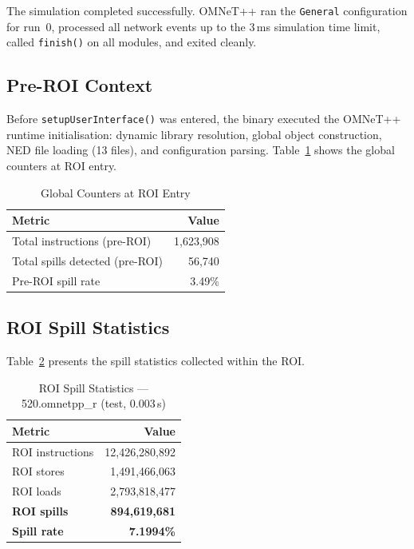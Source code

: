 \documentclass[conference]{IEEEtran}
\begin{document}
The simulation completed successfully. OMNeT++ ran the
\texttt{General} configuration for run~0, processed all network
events up to the 3\,ms simulation time limit, called
\texttt{finish()} on all modules, and exited cleanly.

\subsection{Pre-ROI Context}

Before \texttt{setupUserInterface()} was entered, the binary
executed the OMNeT++ runtime initialisation: dynamic library
resolution, global object construction, NED file loading (13 files),
and configuration parsing. Table~\ref{tab:preroi} shows the global
counters at ROI entry.

\begin{table}[H]
\centering
\caption{Global Counters at ROI Entry}
\label{tab:preroi}
\begin{tabular}{lr}
\toprule
\textbf{Metric} & \textbf{Value} \\
\midrule
Total instructions (pre-ROI) & 1,623,908 \\
Total spills detected (pre-ROI) & 56,740 \\
Pre-ROI spill rate & 3.49\% \\
\bottomrule
\end{tabular}
\end{table}

\subsection{ROI Spill Statistics}

Table~\ref{tab:roi} presents the spill statistics collected within
the ROI.

\begin{table}[H]
\centering
\caption{ROI Spill Statistics --- 520.omnetpp\_r (test, 0.003\,s)}
\label{tab:roi}
\begin{tabular}{lr}
\toprule
\textbf{Metric} & \textbf{Value} \\
\midrule
ROI instructions         & 12,426,280,892 \\
ROI stores               &  1,491,466,063 \\
ROI loads                &  2,793,818,477 \\
\midrule
\textbf{ROI spills}      & \textbf{894,619,681} \\
\textbf{Spill rate}      & \textbf{7.1994\%} \\
\bottomrule
\end{tabular}
\end{table}
\end{document}
